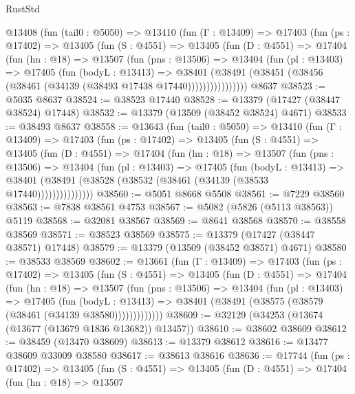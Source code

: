 \begin{lexlean}{RustStd}
\begin{coremodule}
    @13408
      (fun (tail0 : @5050) =>
      @13410
        (fun (Γ : @13409) =>
        @17403
          (fun (ps : @17402) =>
          @13405
            (fun (S : @4551) =>
            @13405
              (fun (D : @4551) =>
              @17404
                (fun (hn : @18) =>
                @13507
                  (fun (pns : @13506) =>
                  @13404
                    (fun (pl : @13403) =>
                    @17405
                      (fun (bodyL : @13413) =>
                      @38401
                        (@38491
                          (@38451 (@38456 (@38461 (@34139 (@38493 @17438 @17440))))))))))))))))
    @8637
@38523 := @5035 @8637
@38524 := @38523 @17440
@38528 := @13379 (@17427 (@38447 @38524) @17448)
@38532 := @13379 (@13509 (@38452 @38524) @4671)
@38533 := @38493 @8637
@38558 := @13643
    (fun (tail0 : @5050) =>
    @13410
      (fun (Γ : @13409) =>
      @17403
        (fun (ps : @17402) =>
        @13405
          (fun (S : @4551) =>
          @13405
            (fun (D : @4551) =>
            @17404
              (fun (hn : @18) =>
              @13507
                (fun (pns : @13506) =>
                @13404
                  (fun (pl : @13403) =>
                  @17405
                    (fun (bodyL : @13413) =>
                    @38401 (@38491 (@38528 (@38532 (@38461 (@34139 (@38533 @17440)))))))))))))))
@38560 := @5051 @8668 @5508
@38561 := @7229 @38560
@38563 := @7838 @38561 @4753
@38567 := @5082 (@5826 (@5113 @38563)) @5119
@38568 := @32081 @38567
@38569 := @8641 @38568
@38570 := @38558 @38569
@38571 := @38523 @38569
@38575 := @13379 (@17427 (@38447 @38571) @17448)
@38579 := @13379 (@13509 (@38452 @38571) @4671)
@38580 := @38533 @38569
@38602 := @13661
    (fun (Γ : @13409) =>
    @17403
      (fun (ps : @17402) =>
      @13405
        (fun (S : @4551) =>
        @13405
          (fun (D : @4551) =>
          @17404
            (fun (hn : @18) =>
            @13507
              (fun (pns : @13506) =>
              @13404
                (fun (pl : @13403) =>
                @17405
                  (fun (bodyL : @13413) =>
                  @38401 (@38491 (@38575 (@38579 (@38461 (@34139 @38580)))))))))))))
@38609 := @32129 (@34253 (@13674 (@13677 (@13679 @1836 @13682)) @13457))
@38610 := @38602 @38609
@38612 := @38459 (@13470 @38609)
@38613 := @13379 @38612
@38616 := @13477 @38609 @33009 @38580
@38617 := @38613 @38616
@38636 := @17744
    (fun (ps : @17402) =>
    @13405
      (fun (S : @4551) =>
      @13405
        (fun (D : @4551) =>
        @17404
          (fun (hn : @18) =>
          @13507

\end{coremodule}
\end{lexlean}
